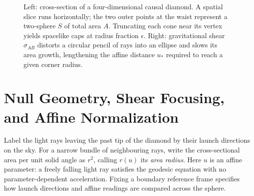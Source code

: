 \documentclass[10pt,a4paper]{article}
\begin{document}
\begin{figure}[htbp]
  \caption{Left: cross-section of a four-dimensional causal diamond. A spatial slice runs horizontally; the two outer points at the waist represent a two-sphere $S$ of total area $A$. Truncating each cone near its vertex yields spacelike caps at radius fraction $\epsilon$. Right: gravitational shear $\sigma_{AB}$ distorts a circular pencil of rays into an ellipse and slows its area growth, lengthening the affine distance $u_*$ required to reach a given corner radius.}
  \label{fig:diamond}
\end{figure}

\section[Null Geometry and Shear Focusing]{Null Geometry, Shear Focusing, and Affine Normalization}
\label{sec:geometry}

Label the light rays leaving the past tip of the diamond by their launch directions on the sky. For a narrow bundle of neighbouring rays, write the cross-sectional area per unit solid angle as $r^2$, calling $r(u)$ its \emph{area radius}. Here $u$ is an affine parameter: a freely falling light ray satisfies the geodesic equation with no parameter-dependent acceleration. Fixing a boundary reference frame specifies how launch directions and affine readings are compared across the sphere.
\end{document}
